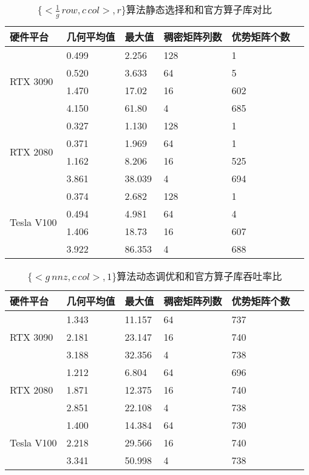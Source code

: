 \begin{table}
  \centering
  \caption{$\{<\frac{1}{g}\,row , c\,col>,r\}$算法静态选择和和官方算子库对比}
  \begin{tabular}{llllll}
  \toprule
  硬件平台 & 几何平均值 & 最大值 & 稠密矩阵列数 & 优势矩阵个数 \\
  \midrule
  \multirow{4}{*}{RTX 3090}& 0.499 & 2.256 & 128 & 1\\
                           & 0.520 & 3.633 & 64 & 5\\
                           & 1.470 & 17.02 & 16 & 602\\
                           & 4.150 & 61.80 & 4 & 685\\
  \hline
  \multirow{4}{*}{RTX 2080}& 0.327 & 1.130 & 128 & 1\\
                          & 0.371 & 1.969  & 64 & 1\\
                          & 1.162 & 8.206  & 16 & 525\\
                          & 3.861 & 38.039 & 4 & 694\\
  \hline
  \multirow{4}{*}{Tesla V100}& 0.374 & 2.682 & 128 & 1\\
                          & 0.494 & 4.981  & 64 & 4\\
                          & 1.406 & 18.73  & 16 & 607\\
                          & 3.922 & 86.353  & 4 & 688\\
  \bottomrule
  \end{tabular}
  \label{tab:dy-cusp-rb}
\end{table}
\begin{table}
  \centering
  \caption{$\{<g\,nnz , c\,col>,1\}$算法动态调优和和官方算子库吞吐率比}
  \begin{tabular}{llllll}
  \toprule
  硬件平台 & 几何平均值 & 最大值  & 稠密矩阵列数 & 优势矩阵个数 \\
  \midrule
  \multirow{3}{*}{RTX 3090}& 1.343 & 11.157 & 64 & 737\\
                           & 2.181 & 23.147  & 16 & 740\\
                           & 3.188 & 32.356  & 4 & 738\\
  \hline
  \multirow{3}{*}{RTX 2080}& 1.212 & 6.804  & 64 & 696\\
                          & 1.871 & 12.375  & 16 & 740\\
                          & 2.851 & 22.108  & 4 & 738\\
  \hline
  \multirow{3}{*}{Tesla V100}& 1.400 & 14.384  & 64 & 730\\
                          & 2.218 & 29.566 & 16 & 740\\
                          & 3.341 & 50.998  & 4 & 738\\
  \bottomrule
  \end{tabular}
  \label{tab:dy-cusp-eb-sr}
\end{table}